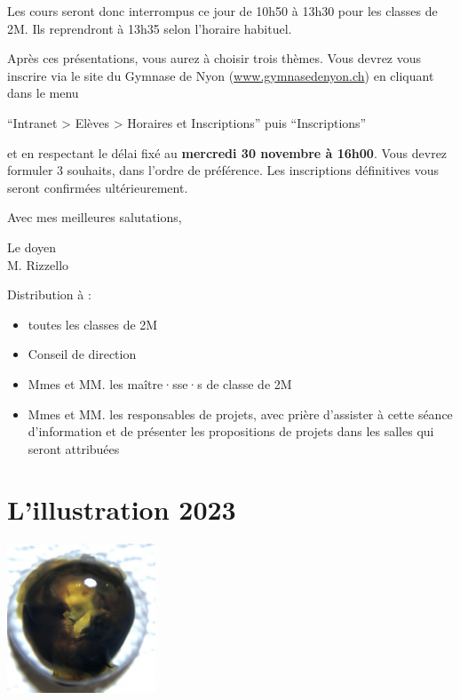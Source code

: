 \documentclass[
  10pt,
  french,
  a5paper,
  openany]{book}
\providecommand{\tightlist}{%
  \setlength{\itemsep}{0pt}\setlength{\parskip}{0pt}}
\newenvironment{signature}{\begin{flushright}}{\end{flushright}}
\begin{document}
Les cours seront donc interrompus ce jour de 10h50 à 13h30 pour les classes de 2M. Ils reprendront à 13h35 selon l'horaire habituel.

\clearpage

Après ces présentations, vous aurez à choisir trois thèmes. Vous devrez vous inscrire via le site du Gymnase de Nyon (\url{www.gymnasedenyon.ch}) en cliquant dans le menu

\begin{center}
``Intranet \textgreater{} Elèves \textgreater{} Horaires et Inscriptions'' puis ``Inscriptions''

\end{center}

et en respectant le délai fixé au \textbf{mercredi 30 novembre à 16h00}. Vous devrez formuler 3 souhaits, dans l'ordre de préférence. Les inscriptions définitives vous seront confirmées ultérieurement.

Avec mes meilleures salutations,

\begin{signature}
Le doyen\\
M. Rizzello

\end{signature}


Distribution à :

\begin{itemize}
\tightlist
\item
  toutes les classes de 2M
\item
  Conseil de direction
\item
  Mmes et MM. les maître·sse·s de classe de 2M
\item
  Mmes et MM. les responsables de projets, avec prière d'assister à cette séance d'information et de présenter les propositions de projets dans les salles qui seront attribuées
\end{itemize}

\hypertarget{lillustration-2023}{%
\chapter*{L'illustration 2023}\label{lillustration-2023}}

\begin{center}
\includegraphics[width=\textwidth,height=12em]{cover.jpg}

\end{center}
\end{document}
